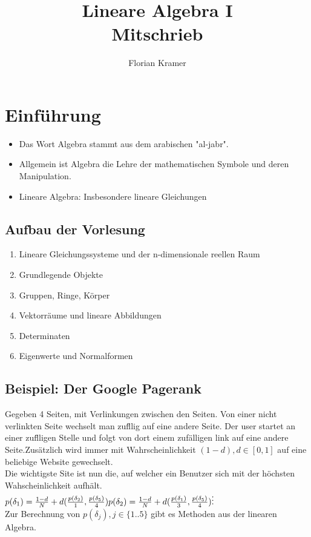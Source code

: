 \documentclass{scrartcl}
\title{Lineare Algebra I\\Mitschrieb}
\author{Florian Kramer}
\begin{document}
\maketitle
\tableofcontents
\pagebreak


\section{Einf\"uhrung}
\begin{itemize}
\item{Das Wort Algebra stammt aus dem arabischen "al-jabr".}
\item{Allgemein ist Algebra die Lehre der mathematischen Symbole und deren Manipulation.}
\item{Lineare Algebra: Insbesondere lineare Gleichungen}
\end{itemize}

\subsection{Aufbau der Vorlesung}
\begin{enumerate}
\item{Lineare Gleichungssysteme und der n-dimensionale reellen Raum}
\item{Grundlegende Objekte}
\item{Gruppen, Ringe, K\"orper}
\item{Vektorr\"aume und lineare Abbildungen}
\item{Determinaten}
\item{Eigenwerte und Normalformen}
\end{enumerate}

\subsection{Beispiel: Der Google Pagerank}
Gegeben 4 Seiten, mit Verlinkungen zwischen den Seiten. Von einer nicht  verlinkten Seite wechselt man zuf\"llig auf eine andere Seite. Der user startet an einer zuf\"lligen Stelle und folgt von dort einem zuf\"alligen link auf eine andere Seite.Zus\"atzlich wird immer mit Wahrscheinlichkeit \((1-d), d \in [0, 1]\) auf eine beliebige Website gewechselt.\\
Die wichtigste Site ist nun die, auf welcher ein Benutzer sich mit der h\"ochsten Wahscheinlichkeit aufh\"alt.\\
\(
p(\delta_1) = \frac{1-d}{N} + d(\frac{p(\delta_2)}{1}, \frac{p(\delta_5)}{4})\\
p(\delta_2) = \frac{1-d}{N} + d(\frac{p(\delta_1)}{3}, \frac{p(\delta_5)}{4})\\
\vdots
\)\\
Zur Berechnung von \(p(\delta_j), j \in \{1..5\}\) gibt es Methoden aus der linearen Algebra.
\end{document}

